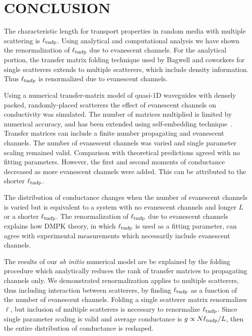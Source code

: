 \section{CONCLUSION}

The characteristic length for transport properties in random media with multiple scattering is $\ell_{\rm tmfp}$. Using analytical and computational analysis we have shown the renormalization of $\ell_{\rm tmfp}$ due to evanescent channels. For the analytical portion, the transfer matrix folding technique used by Bagwell and coworkers for single scatterers extends to multiple scatterers, which include density information. Thus $\ell_{\rm tmfp}$ is renormalized due to evanescent channels. 

Using a numerical transfer-matrix model of quasi-1D waveguides with densely packed, randomly-placed scatterers the effect of evanescent channels on conductivity was simulated. The number of matrices multiplied is limited by numerical accuracy, and has been extended using self-embedding technique~\cite{1999_yamilov_selfembed}. Transfer matrices can include a finite number propagating and evanescent channels. The number of evanescent channels was varied and single parameter scaling remained valid. Comparison with theoretical predictions agreed with no fitting parameters. However, the first and second moments of conductance decreased as more  evanescent channels were added. This can be attributed to the shorter $\ell_{\rm tmfp}$. 

The distribution of conductance changes when the number of evanescent channels is varied but is equivalent to a system with no evanescent channels and longer $L$ or a shorter $\ell_{\rm tmfp}$. The renormalization of $\ell_{\rm tmfp}$ due to evanescent channels explains how DMPK theory, in which $\ell_{\rm tmfp}$ is used as a fitting parameter, can agree with experimental measurements which necessarily include evanescent channels.

The results of our \textit{ab initio} numerical model are be explained by the folding procedure which analytically reduces the rank of transfer matrices to propagating channels only. We demonstrated renormalization applies to multiple scatterers, thus including interaction between scatterers, by finding $\ell_{\rm tmfp}$ as a function of the number of evanescent channels. Folding a single scatterer matrix renormalizes $\ell$, but inclusion of multiple scatterers is necessary to renormalize $\ell_{\rm tmfp}$. Since single parameter scaling is valid and average conductance is $g \propto N \ell_{\rm tmfp}/L$, then the entire distribution of conductance is reshaped. 

